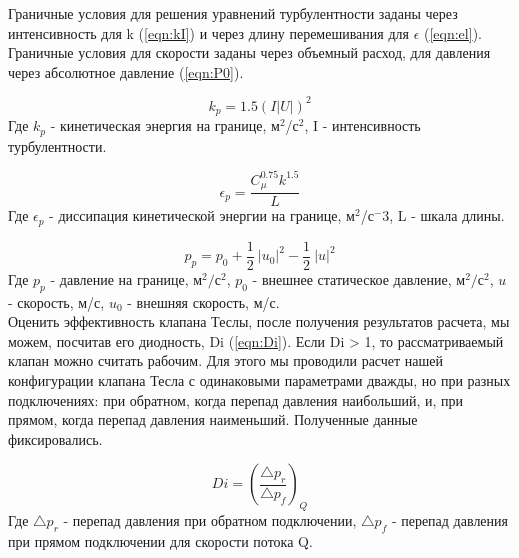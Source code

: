 \documentclass[14pt,a4paper]{article}
\begin{document}
%        
        
        Граничные условия для решения уравнений турбулентности заданы через интенсивность для k (\ref{eqn:kI}) и через длину перемешивания для $\epsilon$ (\ref{eqn:el}). Граничные условия для скорости заданы через объемный расход, для давления через абсолютное давление (\ref{eqn:P0}).
        
        \begin{equation}\label{eqn:kI}
            k_{p} = 1.5 (I |U|)^2
        \end{equation}
        Где $k_{p}$ - кинетическая энергия на границе, м$^2$/с$^2$, I - интенсивность турбулентности.
        
        \begin{equation}\label{eqn:el}
            \epsilon_{p} = \frac{C_{\mu}^{0.75} k^{1.5}}{L}           
        \end{equation}
        Где $\epsilon_{p}$ - диссипация кинетической энергии на границе, м$^2$/с$^-3$, L - шкала длины.
        
        \begin{equation}\label{eqn:P0}
            p_{p} = p_{0} + \frac{1}{2}\ \left|u_{0}\right|^2 - \frac{1}{2}\ \left|u\right|^2
        \end{equation}
        Где $p_{p}$ - давление на границе, м$^{2}/$с$^{2}$, $p_{0}$ - внешнее статическое давление, м$^{2}/$с$^{2}$, $u$ - скорость, м/с, $u_{0}$ - внешняя скорость, м/с.\\
        
        Оценить эффективность клапана Теслы, после получения результатов расчета, мы можем, посчитав его диодность, Di (\ref{eqn:Di}). Если Di > 1, то рассматриваемый клапан можно считать рабочим. Для этого мы проводили расчет нашей конфигурации клапана Тесла с одинаковыми параметрами дважды, но при разных подключениях: при обратном, когда перепад давления наибольший, и, при прямом, когда перепад давления наименьший. Полученные данные фиксировались.         
        
        \begin{equation}\label{eqn:Di}
            Di = (\frac{\bigtriangleup p_{r}}{\bigtriangleup p_{f}})_Q
        \end{equation}
        Где $\bigtriangleup p_{r}$ - перепад давления при обратном подключении, $\bigtriangleup p_{f}$ - перепад давления при прямом подключении для скорости потока Q.
        
\end{document}
